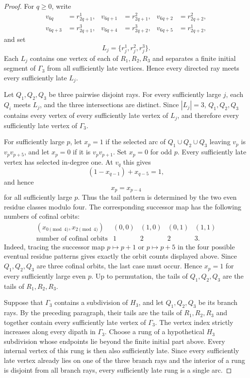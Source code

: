 \documentclass[11pt]{article}
\theoremstyle{remark}
\numberwithin{equation}{section}
\begin{document}
\begin{proof}
For $q\ge0$, write
\[
\begin{aligned}
v_{6q}&=r^1_{2q+1}, & v_{6q+1}&=r^2_{2q+1}, & v_{6q+2}&=r^2_{2q+2},\\
v_{6q+3}&=r^3_{2q+1}, & v_{6q+4}&=r^3_{2q+2}, & v_{6q+5}&=r^1_{2q+2},
\end{aligned}
\]
and set
\[
L_j=\{r^1_j,r^2_j,r^3_j\}.
\]
Each $L_j$ contains one vertex of each of $R_1,R_2,R_3$ and separates a finite initial segment of $\Gamma_3$
from all sufficiently late vertices. Hence every directed ray meets every sufficiently late $L_j$.

Let $Q_1,Q_2,Q_3$ be three pairwise disjoint rays. For every sufficiently large $j$, each $Q_i$ meets $L_j$, and the three intersections are distinct. Since $|L_j|=3$, $Q_1,Q_2,Q_3$ contains every vertex of every sufficiently late vertex of $L_j$, and therefore every sufficiently late vertex of $\Gamma_3$.

For sufficiently large $p$, let $x_p=1$ if the selected arc of $Q_1\cup Q_2\cup Q_3$ leaving $v_p$ is $v_pv_{p+5}$,
and let $x_p=0$ if it is $v_pv_{p+1}$. Set $x_p=0$ for odd $p$. Every sufficiently late vertex has selected in-degree one. At $v_q$ this gives
\[
(1-x_{q-1})+x_{q-5}=1,
\]
and hence
\begin{equation}
x_p=x_{p-4}
\end{equation}
for all sufficiently large $p$. Thus the tail pattern is determined by the two even residue classes modulo four. The corresponding successor map has the following numbers of cofinal orbits:
\[
\begin{array}{c|cccc}
(x_{0\pmod4},x_{2\pmod4})&(0,0)&(1,0)&(0,1)&(1,1)\\\hline
\text{number of cofinal orbits}&1&2&2&3.
\end{array}
\]
Indeed, tracing the successor map $p\mapsto p+1$ or $p\mapsto p+5$ in the four possible eventual residue patterns gives exactly the orbit counts displayed above. Since $Q_1,Q_2,Q_3$ are three cofinal orbits, the last case must occur. Hence $x_p=1$ for every sufficiently large even $p$. Up to permutation, the tails of $Q_1,Q_2,Q_3$ are the tails of $R_1,R_2,R_3$.

Suppose that $\Gamma_3$ contains a subdivision of $H_3$, and let $Q_1,Q_2,Q_3$ be its branch rays. By the preceding paragraph, their tails are the tails of $R_1,R_2,R_3$ and together contain every sufficiently late vertex of $\Gamma_3$. The vertex index strictly increases along every dipath in $\Gamma_3$. Choose a rung of a hypothetical $H_3$ subdivision whose endpoints lie beyond the finite initial part above. Every internal vertex of this rung is then also sufficiently late. Since every sufficiently late vertex already lies on one of the three branch rays and the interior of a rung is disjoint from all branch rays, every sufficiently late rung is a single arc.


\end{proof}
\end{document}
